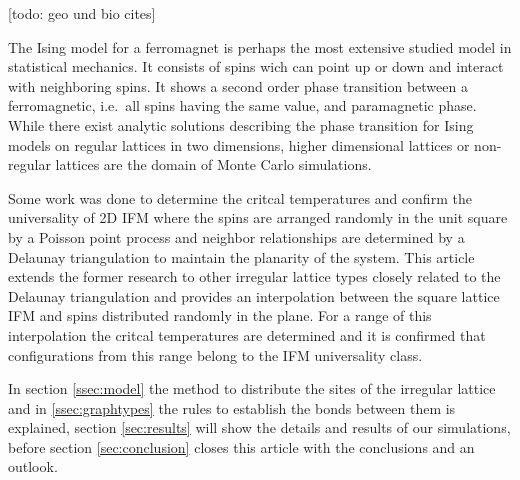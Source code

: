
[todo: geo und bio cites] \cite{Karp2000} \cite{Santi2005} \cite{Bose2001} \cite{Kuhn2003} \cite{Selander1975} \cite{Sokal1978} \cite{Sokal1980}

The Ising model for a ferromagnet \cite{Ising1925} is
perhaps the most extensive studied model in statistical mechanics.
It consists of spins wich can point up or down and interact with
neighboring spins. It shows a second order phase transition between
a ferromagnetic, i.e.~all spins having the same value, and
paramagnetic phase. While there exist analytic solutions\cite{Onsager1944,Wannier1945}
describing the phase transition for Ising models on
regular lattices in two dimensions, higher dimensional lattices or
non-regular lattices are the domain of Monte Carlo simulations.

Some work \cite{Janke1994,Lima2000,Lima2008} was done to determine
the critcal temperatures and confirm the universality of 2D IFM
where the spins are arranged randomly in the unit square by a
Poisson point process and neighbor relationships are determined by a
Delaunay triangulation to maintain the planarity of the system.
This article extends the former research to other
irregular lattice types closely related to the Delaunay triangulation and
provides an interpolation between the square lattice IFM
and spins distributed randomly in the plane.
For a range of this interpolation the critcal temperatures are determined
and it is confirmed that configurations from this range belong to the
IFM universality class.

In section \ref{ssec:model} the method to distribute the sites of the
irregular lattice and in \ref{ssec:graphtypes} the rules to establish the
bonds between them is explained, section \ref{sec:results} will show the
details and results of our simulations, before section \ref{sec:conclusion}
closes this article with the conclusions and an outlook.
